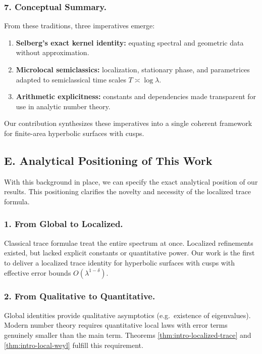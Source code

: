 \subsubsection*{7. Conceptual Summary.}
From these traditions, three imperatives emerge:
\begin{enumerate}[label=\arabic*.]
  \item \textbf{Selberg’s exact kernel identity:}
        equating spectral and geometric data without approximation.
  \item \textbf{Microlocal semiclassics:}
        localization, stationary phase, and parametrices
        adapted to semiclassical time scales $T\asymp \log\lambda$.
  \item \textbf{Arithmetic explicitness:}
        constants and dependencies made transparent
        for use in analytic number theory.
\end{enumerate}
Our contribution synthesizes these imperatives into
a single coherent framework for finite-area hyperbolic surfaces with cusps.

\subsection*{E. Analytical Positioning of This Work}

With this background in place,
we can specify the exact analytical position of our results.
This positioning clarifies the novelty and necessity of the localized trace formula.

\subsubsection*{1. From Global to Localized.}
Classical trace formulae treat the entire spectrum at once.
Localized refinements existed, but lacked explicit constants or quantitative power.
Our work is the first to deliver a localized trace identity for hyperbolic surfaces with cusps
with effective error bounds $O(\lambda^{1-\delta})$.

\subsubsection*{2. From Qualitative to Quantitative.}
Global identities provide qualitative asymptotics (e.g.\ existence of eigenvalues).
Modern number theory requires quantitative local laws with error terms genuinely smaller than the main term.
Theorems \ref{thm:intro-localized-trace} and \ref{thm:intro-local-weyl}
fulfill this requirement.

